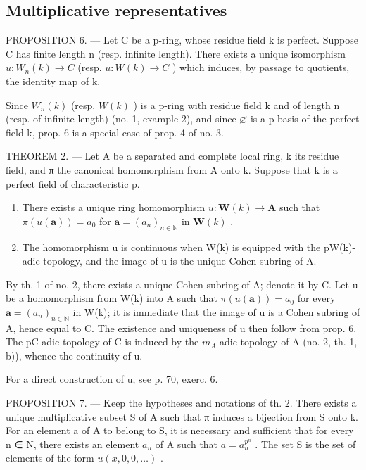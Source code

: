 \subsection{Multiplicative representatives}

PROPOSITION 6. --- Let C be a p-ring, whose residue field k is perfect. Suppose C has finite length n (resp. infinite length). There exists a unique isomorphism \(u:W_{n}(k)\to C\) (resp. \(u:W(k)\to C\) ) which induces, by passage to quotients, the identity map of k.

Since \(W_{n}(k)\) (resp. \(W(k)\) ) is a p-ring with residue field k and of length n (resp. of infinite length) (no. 1, example 2), and since \(\varnothing\) is a p-basis of the perfect field k, prop. 6 is a special case of prop. 4 of no. 3.

THEOREM 2. --- Let A be a separated and complete local ring, k its residue field, and π the canonical homomorphism from A onto k. Suppose that k is a perfect field of characteristic p.

\begin{enumerate}
\def\labelenumi{\alph{enumi})}
\item
  There exists a unique ring homomorphism \(u: \mathbf{W}(k) \to \mathbf{A}\) such that \(\pi(u(\boldsymbol{a})) = a_0\) for \(\boldsymbol{a} = (a_n)_{n \in \mathbb{N}}\) in \(\mathbf{W}(k)\) .
\item
  The homomorphism u is continuous when W(k) is equipped with the pW(k)-adic topology, and the image of u is the unique Cohen subring of A.
\end{enumerate}

By th. 1 of no. 2, there exists a unique Cohen subring of A; denote it by C. Let u be a homomorphism from W(k) into A such that \(\pi(u(\boldsymbol{a})) = a_0\) for every \(\boldsymbol{a} = (a_n)_{n \in \mathbb{N}}\) in W(k); it is immediate that the image of u is a Cohen subring of A, hence equal to C. The existence and uniqueness of u then follow from prop. 6. The pC-adic topology of C is induced by the \(m_{A}\)-adic topology of A (no. 2, th. 1, b)), whence the continuity of u.

For a direct construction of u, see p. 70, exerc. 6.

PROPOSITION 7. --- Keep the hypotheses and notations of th. 2. There exists a unique multiplicative subset S of A such that π induces a bijection from S onto k. For an element a of A to belong to S, it is necessary and sufficient that for every n ∈ N, there exists an element \(a_{n}\) of A such that \(a = a_{n}^{p^{n}}\) . The set S is the set of elements of the form \(u(x, 0, 0, \ldots)\) .

